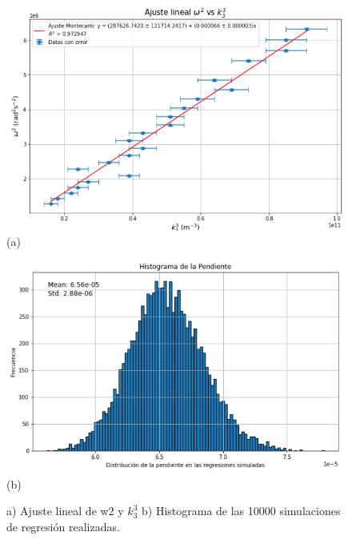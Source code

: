 \begin{figure}[H]
	\centering
	\begin{minipage}{0.46\textwidth} 
		\includegraphics[width=\textwidth]{grafico_02x08_w2k33.png}
		\centering(a)
	\end{minipage}
	\hspace{0.5cm}
	\begin{minipage}{0.49\textwidth} 
		\includegraphics[width=1\textwidth]{grafico_02x09_w2k33hist.png}
		\centering (b)
	\end{minipage}
	\caption{ \footnotesize {a) Ajuste lineal de w2 y $k_3^3$  b) Histograma de las 10000 simulaciones de regresión realizadas.}}
	\label{fig:w2k1}
\end{figure}


